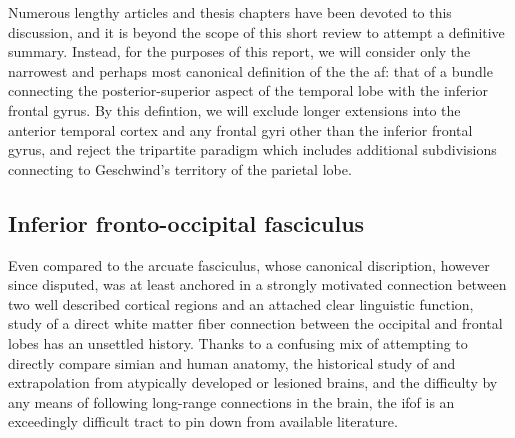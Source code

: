Numerous lengthy articles and thesis chapters have been devoted to this discussion, and it is beyond the scope of this short review to attempt a definitive summary.
Instead, for the purposes of this report, we will consider only the narrowest and perhaps most canonical definition of the the \gls{af}: that of a bundle connecting the posterior-superior aspect of the temporal lobe with the inferior frontal gyrus.
By this defintion, we will exclude longer extensions into the anterior temporal cortex\autocite{Giampiccolo2022a} and any frontal gyri other than the inferior frontal gyrus, and reject the tripartite paradigm which includes additional subdivisions connecting to Geschwind's territory of the parietal lobe.\autocite{Catani2005,Martino2013a}

\subsection{Inferior fronto-occipital fasciculus}


Even compared to the arcuate fasciculus, whose canonical discription, however since disputed, was at least anchored in a strongly motivated connection between two well described cortical regions and an attached clear linguistic function, study of a direct white matter fiber connection between the occipital and frontal lobes has an unsettled history.\autocite{Forkel2014a}
Thanks to a confusing mix of attempting to directly compare simian and human anatomy,\autocite{Schmahmann2007,ThiebautdeSchotten2012,Mandonnet2018,Sarubbo2019} the historical study of and extrapolation from atypically developed or lesioned brains,\autocite{Schmahmann2007,Forkel2014a} and the difficulty by any means of following long-range connections in the brain,
\autocite{Martino2010} the \gls{ifof} is an exceedingly difficult tract to pin down from available literature.\autocite{Sarubbo2019,Weiller2021}

